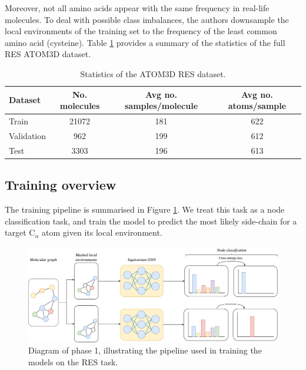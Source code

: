 Moreover, not all amino acids appear with the same frequency in real-life molecules. To deal with possible class imbalances, the authors downsample the local environments of the training set to the frequency of the least common amino acid (cysteine). Table \ref{dataset_stats} provides a summary of the statistics of the full RES ATOM3D dataset.


\begin{table}[]
    \centering
    \begin{tabular}{@{}lccc@{}}
    \toprule
    Dataset    & No. molecules & Avg no. samples/molecule & Avg no. atoms/sample \\ \midrule
    Train      & 21072           & 181                       & 622                   \\
    Validation & 962             & 199                       & 612                   \\
    Test       & 3303            & 196                       & 613                   \\ \bottomrule
    \end{tabular}
    \caption{Statistics of the ATOM3D RES dataset.}
    \label{dataset_stats}
\end{table}

\subsection{Training overview}
\label{training-overview}
The training pipeline is summarised in Figure \ref{res-task}. We treat this task as a node classification task, and train the model to predict the most likely side-chain for a target $\text{C}_{\alpha}$ atom given its local environment.

\begin{figure}[!h]
    \centering
    \includegraphics[width=\textwidth]{masters-report/figures/training-pipeline.png}
    \caption{Diagram of phase 1, illustrating the pipeline used in training the models on the RES task.}
    \label{res-task}
\end{figure}

